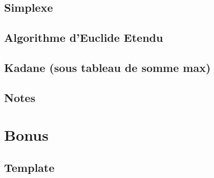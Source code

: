 \documentclass[10pt]{extarticle}
\begin{document}
\subsection{Simplexe}
{\scriptsize}
 
\subsection{Algorithme d'Euclide Etendu}
{\scriptsize}

\subsection{Kadane (sous tableau de somme max)}
{\scriptsize}



\subsection{Notes}



\section{Bonus}
\subsection{Template}
{\scriptsize}
\end{document}
